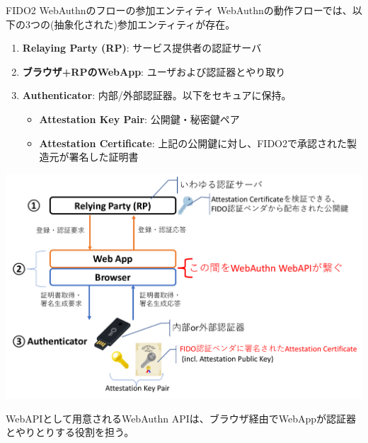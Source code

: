 \documentclass[12pt,dvipdfmx,uplatex]{beamer}
\begin{document}
\begin{frame}{FIDO2 WebAuthnのフローの参加エンティティ}
WebAuthnの動作フローでは、以下の3つの(抽象化された)参加エンティティが存在。
\begin{enumerate}
 \item \textbf{Relaying Party (RP)}: サービス提供者の認証サーバ
 \item \textbf{ブラウザ+RPのWebApp}: ユーザおよび認証器とやり取り
 \item \textbf{Authenticator}: 内部/外部認証器。以下をセキュアに保持。
\begin{itemize}
\item \textbf{\alert{Attestation Key Pair}}: 公開鍵・秘密鍵ペア
\item \textbf{\alert{Attestation Certificate}}: 上記の公開鍵に対し、FIDO2で承認された製造元が署名した証明書
\end{itemize}
\end{enumerate}
\end{frame}
\begin{frame}
\begin{center}
\includegraphics[width=0.9\linewidth]{Figs/webauthn-entities.pdf}
\end{center}
WebAPIとして用意されるWebAuthn APIは、ブラウザ経由でWebAppが認証器とやりとりする役割を担う。
\end{frame}
\end{document}
